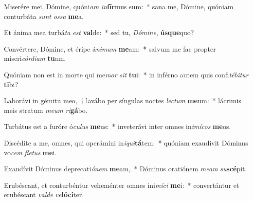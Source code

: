 \item Miserére mei, Dómine, quóni\textit{am} \textit{in}\textbf{fír}mus sum:~* sana me, Dómine, quóniam conturbáta \textit{sunt} \textit{os}\textit{sa} \textbf{me}a.
\item Et ánima mea turbá\textit{ta} \textit{est} \textbf{val}de:~* sed tu, \textit{Dó}\textit{mi}\textit{ne}, \textbf{ús}\textbf{que}quo?
\item Convértere, Dómine, et éripe á\textit{ni}\textit{mam} \textbf{me}am:~* salvum me fac propter miseri\textit{cór}\textit{di}\textit{am} \textbf{tu}am.
\item Quóniam non est in morte qui me\textit{mor} \textit{sit} \textbf{tu}i:~* in inférno autem quis confi\textit{té}\textit{bi}\textit{tur} \textbf{ti}bi?
\item Laborávi in gémitu meo,~† lavábo per síngulas noctes \textit{lec}\textit{tum} \textbf{me}um:~* lácrimis meis stratum \textit{me}\textit{um} \textit{ri}\textbf{gá}bo.
\item Turbátus est a furóre ó\textit{cu}\textit{lus} \textbf{me}us:~* inveterávi inter omnes in\textit{i}\textit{mí}\textit{cos} \textbf{me}os.
\item Discédite a me, omnes, qui operámini in\textit{i}\textit{qui}\textbf{tá}tem:~* quóniam exaudívit Dóminus vo\textit{cem} \textit{fle}\textit{tus} \textbf{me}i.
\item Exaudívit Dóminus deprecati\textit{ó}\textit{nem} \textbf{me}am,~* Dóminus oratiónem \textit{me}\textit{am} \textit{su}\textbf{scé}pit.
\item Erubéscant, et conturbéntur veheménter omnes ini\textit{mí}\textit{ci} \textbf{me}i:~* convertántur et erubéscant \textit{val}\textit{de} \textit{ve}\textbf{ló}\textbf{ci}ter.
